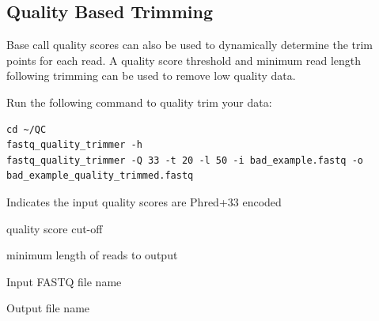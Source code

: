 \subsection{Quality Based Trimming}
Base call quality scores can also be used to dynamically determine the trim
points for each read. A quality score threshold and minimum read length
following trimming can be used to remove low quality data.

\begin{steps}
Run the following command to quality trim your data:
\begin{lstlisting}
cd ~/QC
fastq_quality_trimmer -h
fastq_quality_trimmer -Q 33 -t 20 -l 50 -i bad_example.fastq -o bad_example_quality_trimmed.fastq
\end{lstlisting}
\end{steps}

\begin{note}
\begin{description}[style=multiline,labelindent=0cm,align=right,leftmargin=\descriptionlabelspace,rightmargin=1.5cm,font=\ttfamily]
 \item[-Q 33] Indicates the input quality scores are Phred+33 encoded
 \item[-t] quality score cut-off
 \item[-l] minimum length of reads to output
 \item[-i] Input FASTQ file name
 \item[-o] Output file name
\end{description}
\end{note}

